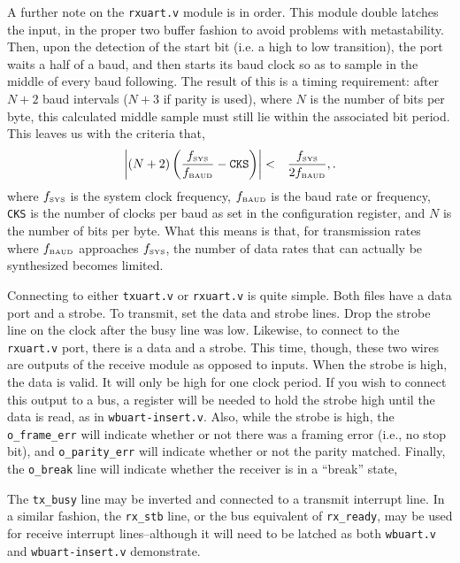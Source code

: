 \documentclass{gqtekspec}
\begin{document}
A further note on the {\tt rxuart.v} module is in order.  This module double
latches the input, in the proper two buffer fashion to avoid problems with
metastability.  Then, upon the detection of the start bit (i.e. a high to low
transition), the port waits a half of a baud, and then starts its baud clock
so as to sample in the middle of every baud following.  The result of this is
a timing requirement: after $N+2$ baud intervals ($N+3$ if parity is used),
where $N$ is the number of bits per byte, this calculated middle sample must
still lie within the associated bit period.  This leaves us with the criteria
that,
\begin{eqnarray}
\left|\left(N+2\right)
	\left(\frac{f_{\mbox{\tiny SYS}}}{f_{\mbox{\tiny BAUD}}}
		-{\mbox{\tt CKS}}\right)\right| 
	&<& \frac{f_{\mbox{\tiny SYS}}}{2f_{\mbox{\tiny BAUD}}},
	\label{eqn:baudlimit}.
\end{eqnarray}
where $f_{\mbox{\tiny SYS}}$ is the system clock frequency,
$f_{\mbox{\tiny BAUD}}$ is the baud rate or frequency,
{\tt CKS} is the number of clocks per baud as set in the configuration
register, and $N$ is the number of bits per byte.  What this means is that,
for transmission rates where $f_{\mbox{\tiny BAUD}}$ approaches
$f_{\mbox{\tiny SYS}}$, the number of data rates that can actually be
synthesized becomes limited.

Connecting to either {\tt txuart.v} or {\tt rxuart.v} is quite simple.  Both
files have a data port and a strobe.  To transmit, set the data and strobe
lines.  Drop the strobe line on the clock after the busy line was low.
Likewise, to connect to the {\tt rxuart.v} port, there is a data
and a strobe.  This time, though, these two wires are outputs of the receive
module as opposed to inputs.
When the strobe is high, the data is valid.  It will only be high for one
clock period.  If you wish to connect this output to a bus, a register will be
needed to hold the strobe high until the data is read, as in
{\tt wbuart-insert.v}.  Also, while the strobe
is high, the {\tt o\_frame\_err} will indicate whether or not there was a 
framing error (i.e., no stop bit), and {\tt o\_parity\_err} will indicate
whether or not the parity matched.  Finally, the {\tt o\_break} line will
indicate whether the receiver is in a ``break'' state,

The {\tt tx\_busy} line may be inverted and connected to a transmit interrupt
line.  In a similar fashion, the {\tt rx\_stb} line, or the bus equivalent of
{\tt rx\_ready}, may be used for receive interrupt lines--although it will need
to be latched as both {\tt wbuart.v} and {\tt wbuart-insert.v} demonstrate.
\end{document}
